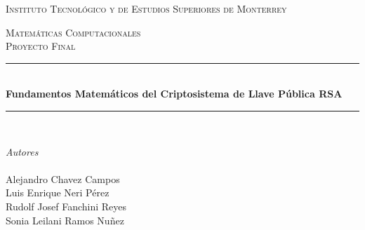\documentclass[12pt, a4paper]{article}
\begin{document}

	\begin{titlepage} %
		\newcommand{\HRule}{\rule{\linewidth}{0.5mm}} %

		\center %


		\textsc{\LARGE Instituto Tecnológico y de Estudios Superiores de Monterrey\singlespacing} %

		\textsc{\Large Matemáticas Computacionales}\\[0.5cm] %

		\textsc{\large Proyecto Final}\\[0.5cm] %


		\HRule\\[0.4cm]

		{\huge\bfseries Fundamentos Matemáticos del Criptosistema de Llave Pública RSA\singlespacing}\\ %

		\HRule\\[1.5cm]


		\begin{center}
			\Large
			\textit{Autores}
			\\[0.5cm]
			\\Alejandro Chavez Campos
			\\Luis Enrique Neri Pérez
			\\Rudolf Josef Fanchini Reyes
			\\Sonia Leilani Ramos Nuñez
		\end{center}



\end{titlepage}
\end{document}
